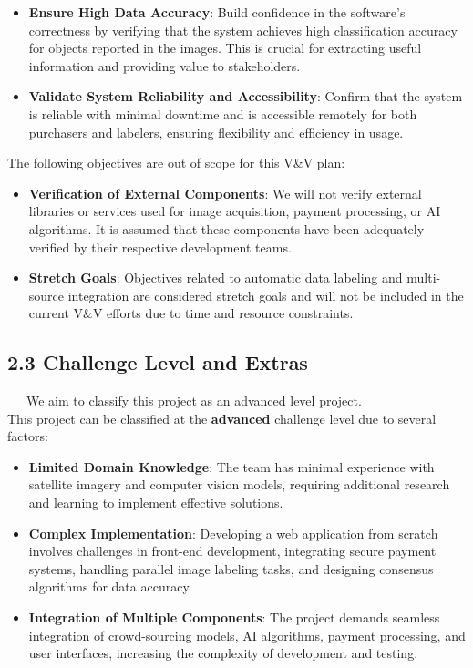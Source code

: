 \documentclass[12pt, titlepage]{article}
\begin{document}
  \begin{itemize}
      \item \textbf{Ensure High Data Accuracy}: Build confidence in the software's correctness by verifying that the system achieves high classification accuracy for objects reported in the images. This is crucial for extracting useful information and providing value to stakeholders.
      \item \textbf{Validate System Reliability and Accessibility}: Confirm that the system is reliable with minimal downtime and is accessible remotely for both purchasers and labelers, ensuring flexibility and efficiency in usage.
  \end{itemize}
  
  The following objectives are out of scope for this V\&V plan:
  
  \begin{itemize}
      \item \textbf{Verification of External Components}: We will not verify external libraries or services used for image acquisition, payment processing, or AI algorithms. It is assumed that these components have been adequately verified by their respective development teams.
      \item \textbf{Stretch Goals}: Objectives related to automatic data labeling and multi-source integration are considered stretch goals and will not be included in the current V\&V efforts due to time and resource constraints.
  \end{itemize}
  
  \subsection{2.3 Challenge Level and Extras}\cite{Development_Plan} \cite{Problem_Statement}
  
  \, \, \, We aim to classify this project as an advanced level project. \\

  This project can be classified at the \textbf{advanced} challenge level due to several factors:
  
  \begin{itemize}
      \item \textbf{Limited Domain Knowledge}: The team has minimal experience with satellite imagery and computer vision models, requiring additional research and learning to implement effective solutions.
      \item \textbf{Complex Implementation}: Developing a web application from scratch involves challenges in front-end development, integrating secure payment systems, handling parallel image labeling tasks, and designing consensus algorithms for data accuracy.
      \item \textbf{Integration of Multiple Components}: The project demands seamless integration of crowd-sourcing models, AI algorithms, payment processing, and user interfaces, increasing the complexity of development and testing.
  \end{itemize}
  
\end{document}
